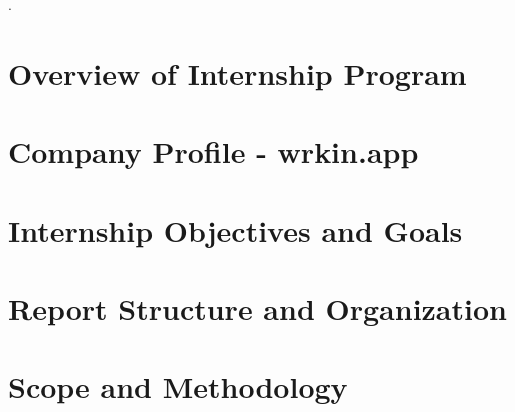 \par \lipsum.


 \section{Overview of Internship Program}
\section{Company Profile - wrkin.app}
\section{Internship Objectives and Goals}
\section{Report Structure and Organization}
 \section{Scope and Methodology}